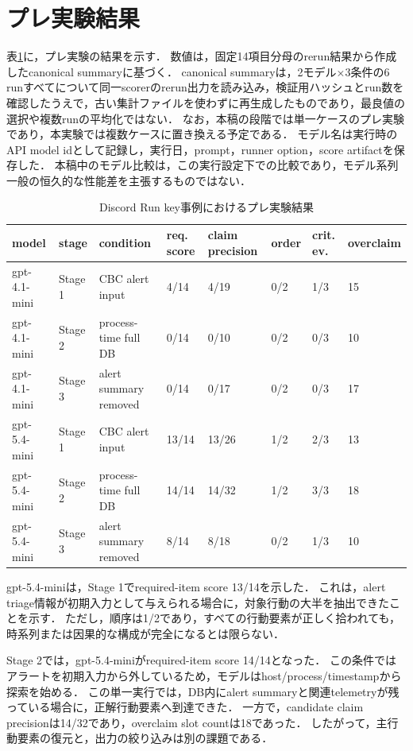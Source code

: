 \documentclass[a4paper,twocolumn,10pt]{ltjsarticle}
\begin{document}
\section{プレ実験結果}

表\ref{tab:result}に，プレ実験の結果を示す．
数値は，固定14項目分母のrerun結果から作成したcanonical summaryに基づく．
canonical summaryは，2モデル×3条件の6 runすべてについて同一scorerのrerun出力を読み込み，検証用ハッシュとrun数を確認したうえで，古い集計ファイルを使わずに再生成したものであり，最良値の選択や複数runの平均化ではない．
なお，本稿の段階では単一ケースのプレ実験であり，本実験では複数ケースに置き換える予定である．
モデル名は実行時のAPI model idとして記録し，実行日，prompt，runner option，score artifactを保存した．
本稿中のモデル比較は，この実行設定下での比較であり，モデル系列一般の恒久的な性能差を主張するものではない．

\begin{table}[t]
\centering
\scriptsize
\caption{Discord Run key事例におけるプレ実験結果}
\label{tab:result}
\begin{tabular}{llllllll}
\toprule
model & stage & condition & req. score & claim precision & order & crit. ev. & overclaim \\
\midrule
gpt-4.1-mini & Stage 1 & CBC alert input & 4/14 & 4/19 & 0/2 & 1/3 & 15 \\
gpt-4.1-mini & Stage 2 & process-time full DB & 0/14 & 0/10 & 0/2 & 0/3 & 10 \\
gpt-4.1-mini & Stage 3 & alert summary removed & 0/14 & 0/17 & 0/2 & 0/3 & 17 \\
gpt-5.4-mini & Stage 1 & CBC alert input & 13/14 & 13/26 & 1/2 & 2/3 & 13 \\
gpt-5.4-mini & Stage 2 & process-time full DB & 14/14 & 14/32 & 1/2 & 3/3 & 18 \\
gpt-5.4-mini & Stage 3 & alert summary removed & 8/14 & 8/18 & 0/2 & 1/3 & 10 \\
\bottomrule
\end{tabular}
\end{table}

gpt-5.4-miniは，Stage 1でrequired-item score 13/14を示した．
これは，alert triage情報が初期入力として与えられる場合に，対象行動の大半を抽出できたことを示す．
ただし，順序は1/2であり，すべての行動要素が正しく拾われても，時系列または因果的な構成が完全になるとは限らない．

Stage 2では，gpt-5.4-miniがrequired-item score 14/14となった．
この条件ではアラートを初期入力から外しているため，モデルはhost/process/timestampから探索を始める．
この単一実行では，DB内にalert summaryと関連telemetryが残っている場合に，正解行動要素へ到達できた．
一方で，candidate claim precisionは14/32であり，overclaim slot countは18であった．
したがって，主行動要素の復元と，出力の絞り込みは別の課題である．
\end{document}
